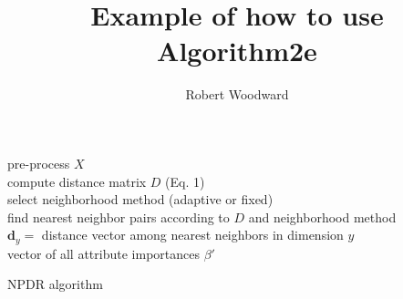 \documentclass{article}
\title{Example of how to use Algorithm2e}
\author{Robert Woodward}
\begin{document}
\begin{algorithm}[H]
{}
pre-process $X$\\
compute distance matrix $D$ (Eq. 1) \\
select neighborhood method (adaptive or fixed)\\
find nearest neighbor pairs according to $D$ and neighborhood method\\
$\mathbf{d}_y=$ distance vector among nearest neighbors in dimension $y$\\
{\Return vector of all attribute importances {\boldmath$\beta'$}}
\caption{NPDR algorithm}
\end{algorithm}
\end{document}
